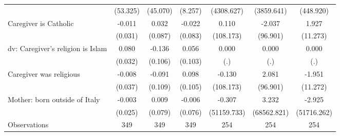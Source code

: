 {\begin{tabular}{l*{6}{c}}
                    &    (53.325)         &    (45.070)         &     (8.257)         &  (4308.627)         &  (3859.641)         &   (448.920)         \\
\addlinespace
Caregiver is Catholic&      -0.011         &       0.032         &      -0.022         &       0.110         &      -2.037         &       1.927         \\
                    &     (0.031)         &     (0.087)         &     (0.083)         &   (108.173)         &    (96.901)         &    (11.273)         \\
\addlinespace
dv: Caregiver's religion is Islam&       0.080\sym{*}  &      -0.136         &       0.056         &       0.000         &       0.000         &       0.000         \\
                    &     (0.032)         &     (0.106)         &     (0.103)         &         (.)         &         (.)         &         (.)         \\
\addlinespace
Caregiver was religious&      -0.008         &      -0.091         &       0.098         &      -0.130         &       2.081         &      -1.951         \\
                    &     (0.037)         &     (0.109)         &     (0.105)         &   (108.173)         &    (96.901)         &    (11.272)         \\
\addlinespace
Mother: born outside of Italy&      -0.003         &       0.009         &      -0.006         &      -0.307         &       3.232         &      -2.925         \\
                    &     (0.025)         &     (0.079)         &     (0.076)         & (51159.733)         & (68562.821)         & (51716.262)         \\
\midrule
Observations        &         349         &         349         &         349         &         254         &         254         &         254         \\
\bottomrule
\end{tabular}
}
